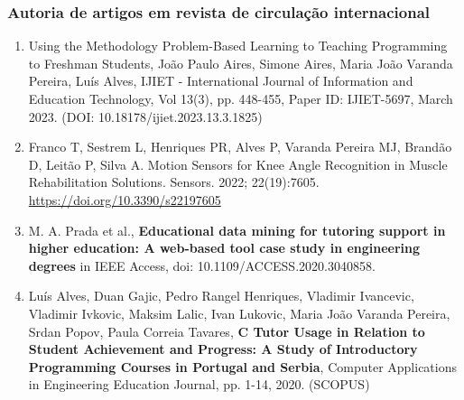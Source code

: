 \documentclass[11pt]{article}
\begin{document}
\subsubsection{Autoria de artigos em revista de circulação internacional}
\begin{enumerate}

\item{ Using the Methodology Problem-Based Learning to Teaching Programming to Freshman Students, João Paulo Aires, Simone Aires, Maria João Varanda Pereira, Luís Alves, IJIET - International Journal of Information and Education Technology, Vol 13(3), pp. 448-455, Paper ID:  IJIET-5697, March 2023. (DOI: 10.18178/ijiet.2023.13.3.1825)}

\item{ Franco T, Sestrem L, Henriques PR, Alves P, Varanda Pereira MJ, Brandão D, Leitão P, Silva A. Motion Sensors for Knee Angle Recognition in Muscle Rehabilitation Solutions. Sensors. 2022; 22(19):7605. \url{https://doi.org/10.3390/s22197605} }

\item{ M. A. Prada et al., {\bf{ {Educational data mining for tutoring support in higher education: A web-based tool case study in engineering degrees}}} in IEEE Access, doi: 10.1109/ACCESS.2020.3040858.}

\item{ Luís Alves, Duan Gajic, Pedro Rangel Henriques, Vladimir Ivancevic, Vladimir Ivkovic, Maksim Lalic, Ivan Lukovic, Maria João Varanda Pereira, Srdan Popov, Paula Correia Tavares, {\bf{ C Tutor Usage in Relation to Student Achievement and Progress: A Study of Introductory Programming Courses in Portugal and Serbia}}, Computer Applications in Engineering Education Journal, pp. 1-14, 2020. (SCOPUS)}


\end{enumerate}
\end{document}
